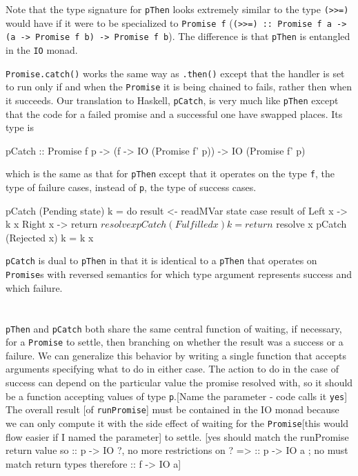 \documentclass[12pt, english, letterpaper]{kuthesis}
\newcommand{\lit}[1]{\texttt{#1}}
\begin{document}
Note that the type signature for \lit{pThen} looks extremely similar to the type \lit{(>>=)} would have if it were to be specialized to \lit{Promise f} (\lit{(>>=) :: Promise f a -> (a -> Promise f b) -> Promise f b}).  The difference is that \lit{pThen} is entangled in the \lit{IO} monad.

 \lit{Promise.catch()} works the same way as \lit{.then()} except that the handler is set to run only if and when the \lit{Promise} it is being chained to fails, rather then when it succeeds.  Our translation to Haskell, \lit{pCatch}, is very much like \lit{pThen} except that the code for a failed promise and a successful one have swapped places.  Its type is
 \begin{code}
pCatch :: Promise f p
        -> (f -> IO (Promise f' p))
        -> IO (Promise f' p)
\end{code}
which is the same as that for \lit{pThen} except that it operates on the type \lit f, the type of failure cases, instead of \lit p, the type of success cases.
\begin{code}
pCatch (Pending state) k = do
  result <- readMVar state
  case result of
    Left x -> k x
    Right x -> return $ resolve x
pCatch (Fulfilled x) k = return $ resolve x
pCatch (Rejected x) k = k x
\end{code}
\lit{pCatch} is dual to \lit{pThen} in that it is identical to a \lit{pThen} that operates on \lit{Promise}s with reversed semantics for which type argument represents success and which failure.

\section*{}
\lit{pThen} and \lit{pCatch} both share the same central function of waiting, if necessary, for a \lit{Promise} to settle, then branching on whether the result was a success or a failure.  We can generalize this behavior by writing a single function that accepts arguments specifying what to do in either case.  The action to do in the case of success can depend on the particular value the promise resolved with, so it should be a function accepting values of type \lit p.[Name the parameter - code calls it \lit{yes}]  The overall result [of \lit{runPromise}] must be contained in the IO monad because we can only compute it with the side effect of waiting for the \lit{Promise}[this would flow easier if I named the parameter] to settle.  [yes should match the runPromise return value so :: p -> IO ?, no more restrictions on ? => :: p -> IO a ; no must match return types therefore :: f -> IO a]
\end{document}
